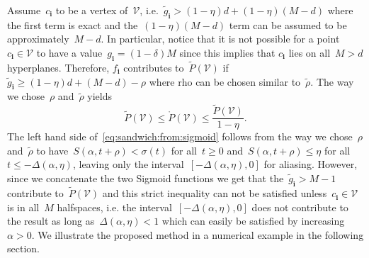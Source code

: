 \documentclass[letterpaper, 10pt, conference]{ieeeconf} %
\providecommand{\bfa}[1]{\mathbf{#1}}
\begin{document}
%
Assume~$c_\bfa{i}$ to be a vertex of~$\mathcal V$, i.e.~$\tilde g_\bfa{i}>(1-\eta)d+(1-\eta)(M-d)$ where the first term is exact and the~$(1-\eta)(M-d)$ term can be assumed to be approximately~$M-d$.
%
In particular, notice that it is not possible for a point~$c_\bfa{i}\in\mathcal V$ to have a value~$g_\bfa{i}=(1-\delta)M$ since this implies that $c_\bfa{i}$ lies on all~$M>d$ hyperplanes.
%
Therefore, $f_\bfa{i}$ contributes to~$\tilde{P}(\mathcal V)$ if~$\tilde g_\bfa{i}\geq(1-\eta)d+(M-d)-\rho$ where rho can be chosen similar to~$\tilde\rho$.
%
The way we chose~$\rho$ and~$\tilde\rho$ yields
%
\begin{equation}\label{eq:sandwich:from:sigmoid}
	\tilde P(\mathcal V)\leq\mathring P(\mathcal V)\leq \frac{\tilde P(\mathcal V)}{1-\eta}.
\end{equation}
%
The left hand side of~\eqref{eq:sandwich:from:sigmoid} follows from the way we chose~$\rho$ and~$\tilde\rho$ to have~$S(\alpha,t+\rho)<\sigma(t)$ for all~$t\geq0$ and~$S(\alpha,t+\rho)\leq\eta$ for all~$t\leq -\Delta(\alpha,\eta)$, leaving only the interval~$[-\Delta(\alpha,\eta),0]$ for aliasing.
%
However, since we concatenate the two Sigmoid functions we get that the~$\tilde g_\bfa{i}>M-1$ contribute to~$\tilde P(\mathcal V)$ and this strict inequality can not be satisfied unless~$c_\bfa{i}\in\mathcal V$ is in all~$M$ halfspaces, i.e. the interval~$[-\Delta(\alpha,\eta),0]$ does not contribute to the result as long as~$\Delta(\alpha,\eta)<1$ which can easily be satisfied by increasing~$\alpha>0$.
%
We illustrate the proposed method in a numerical example in the following section.
\end{document}
